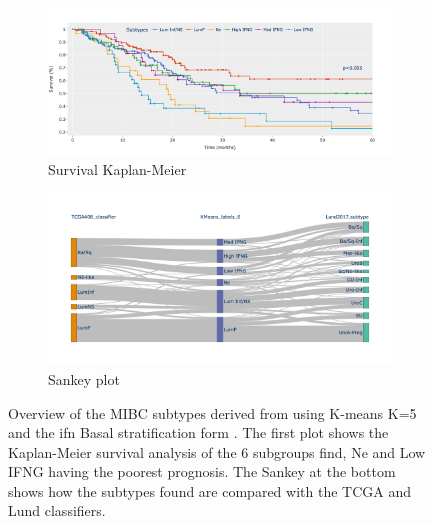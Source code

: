 \begin{figure}[!htb]
    \centering
    \begin{subfigure}[!t]{1.0\textwidth}
        \includegraphics[width=\textwidth,keepaspectratio]{Sections/ClusteringAnalysis/Resources/discussion/survival_K_6.png}    
        \caption{Survival Kaplan-Meier}
        \label{fig:cs:survail_K}
    \end{subfigure}
    \centering
    \begin{subfigure}[!t]{1.0\textwidth}
        \includegraphics[width=\textwidth,keepaspectratio]{Sections/ClusteringAnalysis/Resources/discussion/KMeans_6_comp.png}
        \caption{Sankey plot}
        \label{fig:cs:stroma_basal}
    \end{subfigure} 
    \centering
    \caption{Overview of the MIBC subtypes derived from using K-means K=5 and the \acrshort{ifn} Basal stratification form \citet{Baker2022-bj}. The first plot shows the Kaplan-Meier survival analysis of the 6 subgroups find, Ne and Low IFNG having the poorest prognosis. The Sankey at the bottom shows how the subtypes found are compared with the TCGA \citet{Robertson2017-mg} and Lund \citet{Marzouka2018-ge} classifiers.} 
    \label{fig:cs:overview_K_means_6}
\end{figure}


\newpage

